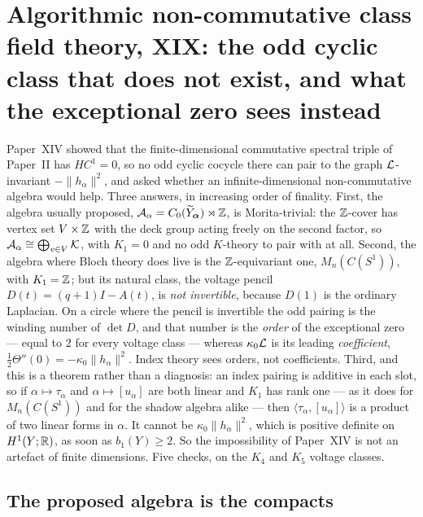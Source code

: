 \chapter[XIX. The odd cyclic class that does not exist, and what the exceptional zero sees instead]{Algorithmic non-commutative class field theory, XIX: the odd cyclic class that does not exist, and what the exceptional zero sees instead}\label{chap:XIX}
\begin{chapterabstract}
Paper~XIV showed that the finite-dimensional commutative spectral triple of Paper~II has
$HC^1=0$, so no odd cyclic cocycle there can pair to the graph $\mathcal{L}$-invariant
$-\|h_\alpha\|^2$, and asked whether an infinite-dimensional non-commutative algebra
would help. Three answers, in increasing order of finality. First, the algebra usually
proposed, $\mathcal{A}_\alpha=C_0(\widetilde Y_{\bm\alpha})\rtimes\mathbb{Z}$, is Morita-trivial: the $\mathbb{Z}$-cover has vertex set
$V\times\mathbb{Z}$ with the deck group acting freely on the second factor, so
$\mathcal{A}_\alpha\cong\bigoplus_{v\in V}\mathcal{K}$, with $K_1=0$ and no odd $K$-theory to pair with at
all. Second, the algebra where Bloch theory does live is the $\mathbb{Z}$-equivariant one,
$M_n(C(S^1))$, with $K_1=\mathbb{Z}$; but its natural class, the voltage pencil
$D(t)=(q+1)I-A(t)$, is \emph{not invertible}, because $D(1)$ is the ordinary Laplacian.
On a circle where the pencil is invertible the odd pairing is the winding number of
$\det D$, and that number is the \emph{order} of the exceptional zero --- equal to $2$ for
every voltage class --- whereas $\kappa_0\mathcal{L}$ is its leading \emph{coefficient},
$\tfrac12\Theta''(0)=-\kappa_0\|h_\alpha\|^2$. Index theory sees orders, not
coefficients. Third, and this is a theorem rather than a diagnosis: an index pairing is
additive in each slot, so if $\alpha\mapsto\tau_\alpha$ and $\alpha\mapsto[u_\alpha]$ are
both linear and $K_1$ has rank one --- as it does for $M_n(C(S^1))$ and for the shadow
algebra alike --- then $\langle\tau_\alpha,[u_\alpha]\rangle$ is a product of two linear
forms in $\alpha$. It cannot be $\kappa_0\|h_\alpha\|^2$, which is positive definite on
$H^1(Y;\mathbb{R})$, as soon as $b_1(Y)\ge2$. So the impossibility of Paper~XIV is not an artefact
of finite dimensions. Five checks, on the $K_4$ and $K_5$ voltage classes.
\end{chapterabstract}

\section{The proposed algebra is the compacts}\label{XIX:sec:crossed}

